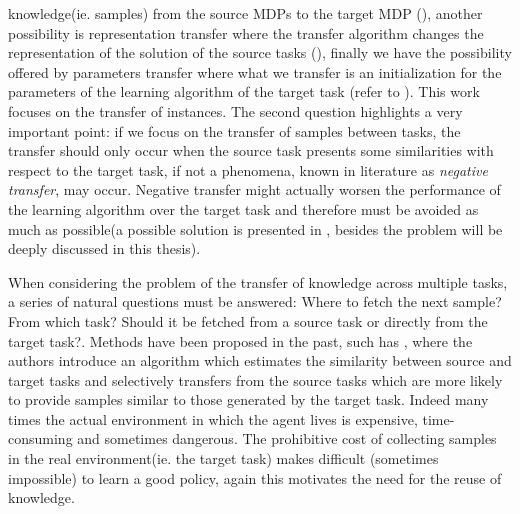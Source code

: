   knowledge(ie. samples) from the source MDPs to the target MDP (\cite{lazaric2008transfer}), another possibility is
  representation transfer where the transfer algorithm changes the representation of the solution of the
  source tasks (\cite{singh2004intrinsically}), finally we have the possibility offered by parameters transfer where what we transfer
  is an initialization for the parameters of the learning algorithm of the target task (refer to \cite{lazaric2012transfer}).\newline
  This work focuses on the transfer of instances.\newline
  The second question highlights a very important point: if we focus on the transfer of samples between tasks, the
  transfer should only occur when the source task presents some similarities with respect
  to the target task, if not a phenomena, known in literature as \textit{negative transfer}, may occur.
  Negative transfer might actually worsen the performance of the learning algorithm over
  the target task and therefore must be avoided as much as possible(a possible solution is
  presented in \cite{lazaric2008transfer}, besides the problem will be deeply discussed in this thesis).\newline

  \noindent When considering the problem of the transfer of knowledge across multiple tasks, a series of natural
  questions must be answered: Where to fetch the next sample? From which task? Should it be fetched from
  a source task or directly from the target task?. Methods have been proposed in the past, such has \cite{lazaric2008transfer},
  where the authors introduce an algorithm which estimates the similarity between source and target tasks and selectively transfers
  from the source tasks which are more likely to provide samples similar to those generated by the target task.\newline
  Indeed many times the actual environment in which the agent lives is expensive, time-consuming and sometimes
  dangerous. The prohibitive cost of collecting samples in the real environment(ie. the target task)
  makes difficult (sometimes impossible) to learn a good policy, again this motivates the need for
  the reuse of knowledge.\newline

